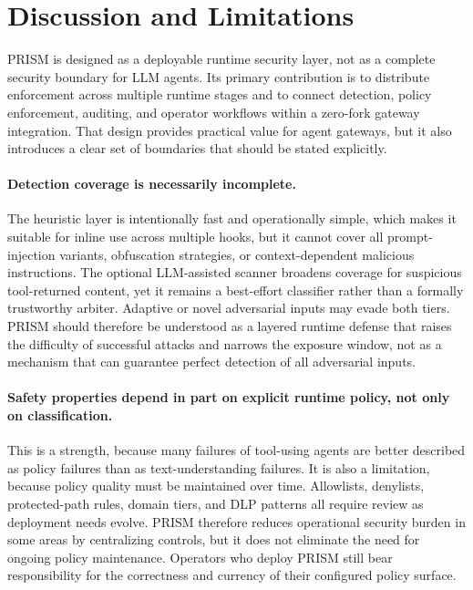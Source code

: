 \section{Discussion and Limitations}

PRISM is designed as a deployable runtime security layer, not as a complete security boundary for LLM agents. Its primary contribution is to distribute enforcement across multiple runtime stages and to connect detection, policy enforcement, auditing, and operator workflows within a zero-fork gateway integration. That design provides practical value for agent gateways, but it also introduces a clear set of boundaries that should be stated explicitly.

\paragraph{Detection coverage is necessarily incomplete.} The heuristic layer is intentionally fast and operationally simple, which makes it suitable for inline use across multiple hooks, but it cannot cover all prompt-injection variants, obfuscation strategies, or context-dependent malicious instructions. The optional LLM-assisted scanner broadens coverage for suspicious tool-returned content, yet it remains a best-effort classifier rather than a formally trustworthy arbiter. Adaptive or novel adversarial inputs may evade both tiers. PRISM should therefore be understood as a layered runtime defense that raises the difficulty of successful attacks and narrows the exposure window, not as a mechanism that can guarantee perfect detection of all adversarial inputs.

\paragraph{Safety properties depend in part on explicit runtime policy, not only on classification.} This is a strength, because many failures of tool-using agents are better described as policy failures than as text-understanding failures. It is also a limitation, because policy quality must be maintained over time. Allowlists, denylists, protected-path rules, domain tiers, and DLP patterns all require review as deployment needs evolve. PRISM therefore reduces operational security burden in some areas by centralizing controls, but it does not eliminate the need for ongoing policy maintenance. Operators who deploy PRISM still bear responsibility for the correctness and currency of their configured policy surface.

